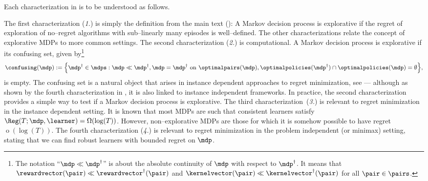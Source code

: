 \documentclass[preprint,cleveref,12pt]{colt2025}
\DeclarePairedDelimiter{\braces}{\{}{\}}	%
\DeclareMathOperator*{\oh}{\mathrm{o}}
\def\model{\mdp}
\def\models{\mdps}
\def\kernel{\kernelvector}
\def\reward{\rewardvector}
\def\optpolicies{\optimalpolicies}
\def\optpairs{\optimalpairs}
\begin{document}
    Each characterization in  is to be understood as follows.

    The first characterization (\textit{1.}) is simply the definition from the main text (): A Markov decision process is explorative if the regret of exploration of no--regret algorithms with sub--linearly many episodes is well--defined.
    The other characterizations relate the concept of explorative MDPs to more common settings. 
    The second characterization (\textit{2.}) is computational. 
    A Markov decision process is explorative if its confusing set, given by\footnote{The notation ``$\model \ll \model^\dagger$'' is about the absolute continuity of $\model$ with respect to $\model^\dagger$. It means that $\reward(\pair) \ll \reward^\dagger(\pair)$ and $\kernel(\pair) \ll \kernel^\dagger(\pair)$ for all $\pair \in \pairs$.}
    \begin{equation}
    \label{equation_confusing_set}
        \confusing(\model) 
        :=
        \braces[\Big]{
            \model^\dagger \in \models:
            \model \ll \model^\dagger
            , 
            \model = \model^\dagger \mathrm{~on~} \optpairs(\model)
            ,
            \optpolicies(\model^\dagger) \cap \optpolicies(\model) = \emptyset
        },
    \end{equation}
    is empty.
    The confusing set is a natural object that arises in instance dependent approaches to regret minimization, see \cite{lai_asymptotically_1985,burnetas_optimal_1997,tranos_regret_2021,boone_regret_2025} --- although as shown by the fourth characterization in , it is also linked to instance independent frameworks.
    In practice, the second characterization provides a simple way to test if a Markov decision process is explorative. 
    The third characterization~(\textit{3.}) is relevant to regret minimization in the instance dependent setting.
    It is known that most MDPs are such that consistent learners satisfy $\Reg(T; \model, \learner) = \Omega(\log(T))$. 
    However, non--explorative MDPs are those for which it is somehow possible to have regret $\oh(\log(T))$.
    The fourth characterization (\textit{4.}) is relevant to regret minimization in the problem independent (or minimax) setting, stating that we can find robust learners with bounded regret on $\model$. 
\end{document}
